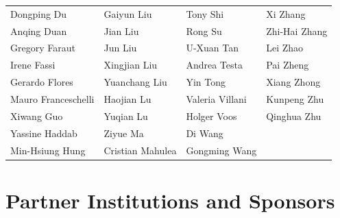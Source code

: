 \documentclass[
	openany, %
	parskip=full, %
	12pt, %
	a4paper, %
]{conferencebooklet} %
\begin{document}
\begin{table}[h!]
\begin{tabular}{llll}
             Dongping	Du	&
             Gaiyun	Liu	&
             Tony	Shi	&
             Xi	Zhang	\\
             Anqing	Duan	&
             Jian	Liu	&
             Rong	Su	&
             Zhi-Hai	Zhang	\\
             Gregory	Faraut	&
             Jun	Liu	&
             U-Xuan	Tan	&
             Lei	Zhao	\\
             Irene	Fassi	&
             Xingjian	Liu	&
             Andrea	Testa	&
             Pai	Zheng	\\
             Gerardo	Flores	&
             Yuanchang	Liu	&
             Yin	Tong	&
             Xiang	Zhong	\\
             Mauro	Franceschelli	&
             Haojian	Lu	&
             Valeria	Villani	&
             Kunpeng	Zhu	\\
             Xiwang	Guo	&
             Yuqian	Lu	&
             Holger	Voos	&
             Qinghua	Zhu	\\
             Yassine	Haddab	&
             Ziyue	Ma	&
             Di	Wang	&
	      	\\
             Min-Hsiung	Hung	&
             Cristian	Mahulea	&
             Gongming	Wang	&
           	\\
   \end{tabular}
\end{table}


\newpage

\chapter{Partner Institutions and Sponsors}



\def\sponsorscaling{0.95}
\end{document}
